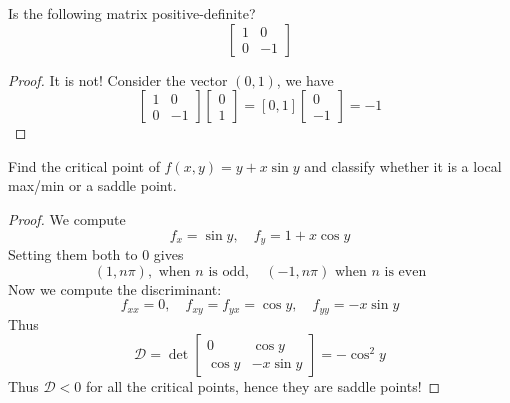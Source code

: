 \documentclass[openany]{book}
\begin{document}
\begin{prob}
    Is the following matrix positive-definite?
    \begin{equation*}
        \begin{bmatrix}
            1&0\\
            0&-1
        \end{bmatrix}
    \end{equation*}
\end{prob}
\begin{proof}
    It is not! Consider the vector $(0,1)$, we have 
    \begin{equation*}
        [0, 1]
\begin{bmatrix}
        1&0\\
        0&-1
    \end{bmatrix}\begin{bmatrix}
        0\\
        1
    \end{bmatrix}
    =[0,1]\begin{bmatrix}
        0\\
        -1
    \end{bmatrix}=-1
\end{equation*}
\end{proof}


\begin{prob}
    Find the critical point of $f(x,y)=y+x\sin y$ and classify whether it is a local max/min or a saddle point.
\end{prob}
\begin{proof}
    We compute 
    \begin{equation*}
        f_x=\sin y, \quad f_y=1+x\cos y
    \end{equation*}
    Setting them both to $0$ gives 
    \begin{equation*}
        (1, n\pi), \text{ when $n$ is odd}, \quad (-1,n\pi) \text{ when $n$ is even}
    \end{equation*}
    Now we compute the discriminant:
    \begin{equation*}
        f_{xx}=0, \quad f_{xy}=f_{yx}=\cos y, \quad f_{yy}=-x\sin y
    \end{equation*}
    Thus 
    \begin{equation*}
        \mathcal{D}=\det\begin{bmatrix}
            0&\cos y\\
            \cos y&-x\sin y
        \end{bmatrix}=-\cos^2y
    \end{equation*}
    Thus $\mathcal{D}<0$ for all the critical points, hence they are saddle points!
\end{proof}
\end{document}
